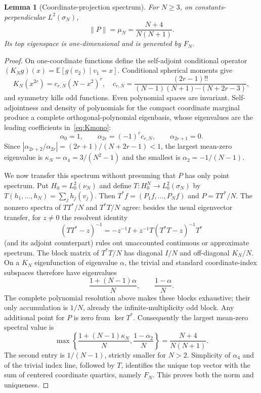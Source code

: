 \documentclass[9pt]{extarticle}
\newtheorem{lemma}{Lemma}
\newcommand{\E}{\mathbb E}
\begin{document}
\begin{lemma}[Coordinate-projection spectrum]\label{lem:P}
For $N\geq3$, on constants-perpendicular $L^2(\sigma_N)$,
\[
 \|P\|=\mu_N=\frac{N+4}{N(N+1)}.
\]
Its top eigenspace is one-dimensional and is generated by $F_N$.
\end{lemma}
\begin{proof}
On one-coordinate functions define the self-adjoint conditional operator
$(K_Ng)(x)=\E[g(v_2)\mid v_1=x]$.  Conditional spherical moments give
\begin{equation}\label{eq:Kmono}
 K_N(x^{2r})=c_{r,N}(N-x^2)^r,
 \quad
 c_{r,N}=\frac{(2r-1)!!}{(N-1)(N+1)\cdots(N+2r-3)},
\end{equation}
and symmetry kills odd functions.  Even polynomial spaces are invariant.
Self-adjointness and density of polynomials for the compact coordinate
marginal produce a complete orthogonal-polynomial eigenbasis, whose
eigenvalues are the leading coefficients in~\eqref{eq:Kmono}:
\[
 \alpha_0=1,\qquad \alpha_{2r}=(-1)^rc_{r,N},\qquad
 \alpha_{2r+1}=0.
\]
Since $|\alpha_{2r+2}/\alpha_{2r}|=(2r+1)/(N+2r-1)<1$,
the largest mean-zero eigenvalue is
$\kappa_N=\alpha_4=3/(N^2-1)$ and the smallest is
$\alpha_2=-1/(N-1)$.

We now transfer this spectrum without presuming that $P$ has only point
spectrum.  Put $H_0=L^2_0(\nu_N)$ and define
$T:H_0^N\to L^2_0(\sigma_N)$ by
$T(h_1,\ldots,h_N)=\sum_jh_j(v_j)$.  Then
$T^*f=(P_1f,\ldots,P_Nf)$ and $P=TT^*/N$.  The nonzero spectra of
$TT^*/N$ and $T^*T/N$ agree: besides the usual eigenvector transfer, for
$z\ne0$ the resolvent identity
\[
 (TT^*-z)^{-1}=-z^{-1}I+z^{-1}T(T^*T-z)^{-1}T^*
\]
(and its adjoint counterpart) rules out unaccounted continuous or approximate
spectrum.  The block matrix of $T^*T/N$ has diagonal $I/N$ and off-diagonal
$K_N/N$.  On a $K_N$ eigenfunction of eigenvalue $\alpha$, the trivial and
standard coordinate-index subspaces therefore have eigenvalues
\[
 \frac{1+(N-1)\alpha}{N},\qquad \frac{1-\alpha}{N}.
\]
The complete polynomial resolution above makes these blocks exhaustive;
their only accumulation is $1/N$, already the infinite-multiplicity odd
block.  Any additional point for $P$ is zero from $\ker T^*$.  Consequently
the largest mean-zero spectral value is
\[
 \max\left\{\frac{1+(N-1)\kappa_N}{N},
             \frac{1-\alpha_2}{N}\right\}
 =\frac{N+4}{N(N+1)}.
\]
The second entry is $1/(N-1)$, strictly smaller for $N>2$.
Simplicity of $\alpha_4$ and of the trivial index line, followed by $T$,
identifies the unique top vector with the sum of centered coordinate
quartics, namely $F_N$.  This proves both the norm and uniqueness.
\end{proof}
\end{document}
